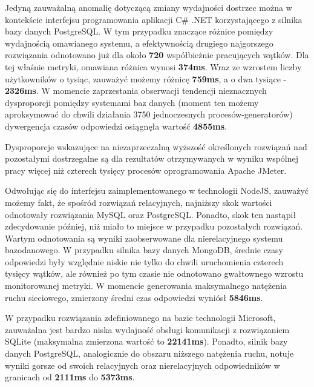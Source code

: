 Jedyną zauważalną anomalię dotyczącą zmiany wydajności dostrzec można w kontekście interfejsu programowania aplikacji C\# .NET korzystającego z silnika bazy danych PostgreSQL. W tym przypadku znaczące różnice pomiędzy wydajnością omawianego systemu, a efektywnością drugiego najgorszego rozwiązania odnotowano już dla około \textbf{720} współbieżnie pracujących wątków. Dla tej właśnie metryki, omawiana różnica wynosi \textbf{374ms}. Wraz ze wzrostem liczby użytkowników o tysiąc, zauważyć możemy różnicę \textbf{759ms}, a o dwa tysiące - \textbf{2326ms}. W momencie zaprzestania obserwacji tendencji nieznacznych dysproporcji pomiędzy systemami baz danych (moment ten możemy aproksymować do chwili działania 3750 jednoczesnych procesów-generatorów) dywergencja czasów odpowiedzi osiągnęła wartość \textbf{4855ms}.

Dysproporcje wskazujące na niezaprzeczalną wyższość określonych rozwiązań nad pozostałymi dostrzegalne są dla rezultatów otrzymywanych w wyniku wspólnej pracy więcej niż czterech tysięcy procesów oprogramowania Apache JMeter. 

Odwołując się do interfejsu zaimplementowanego w technologii NodeJS, zauważyć możemy fakt, że spośród rozwiązań relacyjnych, najniższy skok wartości odnotowały rozwiązania MySQL oraz PostgreSQL. Ponadto, skok ten nastąpił zdecydowanie później, niż miało to miejsce w przypadku pozostałych rozwiązań. Wartym odnotowania są wyniki zaobserwowane dla nierelacyjnego systemu bazodanowego. W przypadku silnika bazy danych MongoDB, średnie czasy odpowiedzi były względnie niskie nie tylko do chwili uruchomienia czterech tysięcy wątków, ale również po tym czasie nie odnotowano gwałtownego wzrostu monitorowanej metryki. W momencie generowania maksymalnego natężenia ruchu sieciowego, zmierzony średni czas odpowiedzi wyniósł \textbf{5846ms}.

W przypadku rozwiązania zdefiniowanego na bazie technologii Microsoft, zauważalna jest bardzo niska wydajność obsługi komunikacji z rozwiązaniem SQLite (maksymalna zmierzona wartość to \textbf{22141ms}). Ponadto, silnik bazy danych PostgreSQL, analogicznie do obszaru niższego natężenia ruchu, notuje wyniki gorsze od swoich relacyjnych oraz nierelacyjnych odpowiedników w granicach od \textbf{2111ms} do \textbf{5373ms}.

